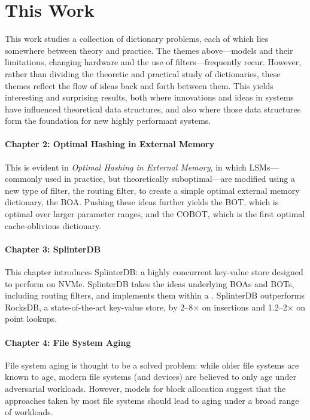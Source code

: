 \section{This Work}

This work studies a collection of dictionary problems, each of which lies
somewhere between theory and practice. The themes above---models and their
limitations, changing hardware and the use of filters---frequently recur.
However, rather than dividing the theoretic and practical study of
dictionaries, these themes reflect the flow of ideas back and forth between
them. This yields interesting and surprising results, both where innovations
and ideas in systems have influenced theoretical data structures, and also
where those data structures form the foundation for new highly performant
systems.

\paragraph{Chapter 2: Optimal Hashing in External Memory}

This is evident in \textit{Optimal Hashing in External Memory}, in which
LSMs---commonly used in practice, but theoretically suboptimal---are modified
using a new type of filter, the routing filter, to create a simple optimal
external memory dictionary, the BOA. Pushing these ideas further yields the BOT,
which is optimal over larger parameter ranges, and the COBOT, which is the
first optimal cache-oblivious dictionary.

\paragraph{Chapter 3: SplinterDB}

This chapter introduces SplinterDB: a highly concurrent key-value store
designed to perform on NVMe. SplinterDB takes the ideas underlying BOAs and
BOTs, including routing filters, and implements them within a \bet. SplinterDB
outperforms RocksDB, a state-of-the-art key-value store, by 2--8$\times$ on
insertions and 1.2--2$\times$ on point lookups.

\paragraph{Chapter 4: File System Aging}

File system aging is thought to be a solved problem: while older file systems
are known to age, modern file systems (and devices) are believed to only age
under adversarial workloads. However, models for block allocation suggest that
the approaches taken by most file systems should lead to aging under a broad
range of workloads.

